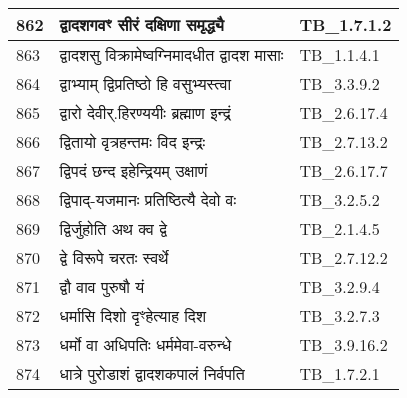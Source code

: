 \documentclass[17pt]{extarticle}
\begin{document}
\begin{longtable}{||p{0.4in}||p{4.9in}||p{0.9in}||}
    862 & द्वादशगवꣳ सीरं दक्षिणा समृद्ध्यै & TB\_1.7.1.2       \\
    
    \hline
        
    863 & द्वादशसु विक्रामेष्वग्निमादधीत द्वादश मासाः & TB\_1.1.4.1       \\
    
    \hline
        
    864 & द्वाभ्याम् द्विप्रतिष्ठो हि वसुभ्यस्त्वा & TB\_3.3.9.2       \\
    
    \hline
        
    865 & द्वारो देवीर्.हिरण्ययीः ब्रह्माण इन्द्रं & TB\_2.6.17.4       \\
    
    \hline
        
    866 & द्वितायो वृत्रहन्तमः विद इन्द्रः & TB\_2.7.13.2       \\
    
    \hline
        
    867 & द्विपदं छन्द इहेन्द्रियम् उक्षाणं & TB\_2.6.17.7       \\
    
    \hline
        
    868 & द्विपाद्{-}यजमानः प्रतिष्ठित्यै देवो वः & TB\_3.2.5.2       \\
    
    \hline
        
    869 & द्विर्जुहोति अथ क्व द्वे & TB\_2.1.4.5       \\
    
    \hline
        
    870 & द्वे विरूपे चरतः स्वर्थे & TB\_2.7.12.2       \\
    
    \hline
        
    871 & द्वौ वाव पुरुषौ यं & TB\_3.2.9.4       \\
    
    \hline
        
    872 & धर्मासि दिशो दृꣳहेत्याह दिश & TB\_3.2.7.3       \\
    
    \hline
        
    873 & धर्मो वा अधिपतिः धर्ममेवा{-}वरुन्धे & TB\_3.9.16.2       \\
    
    \hline
        
    874 & धात्रे पुरोडाशं द्वादशकपालं निर्वपति & TB\_1.7.2.1       \\
    

\end{longtable}
\end{document}
